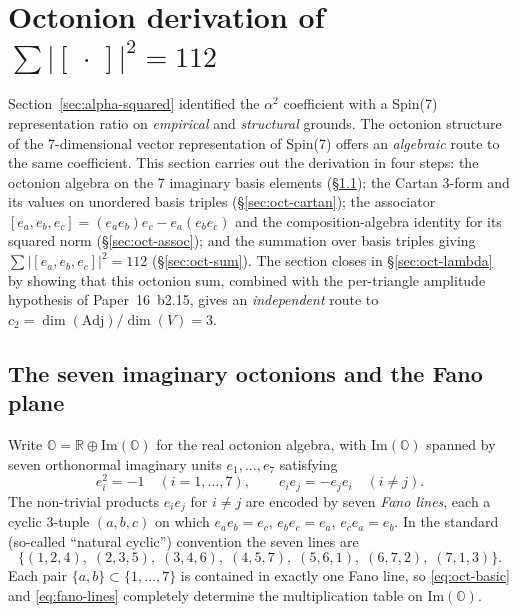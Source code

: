 \documentclass[11pt]{article}
\newcommand{\Adj}{\mathrm{Adj}}
\begin{document}
\section{Octonion derivation of $\sum|[\,\cdot\,]|^2 = 112$}
\label{sec:octonion-112}

Section~\ref{sec:alpha-squared} identified the $\alpha^2$
coefficient with a Spin(7) representation ratio on
\emph{empirical} and \emph{structural} grounds.  The octonion
structure of the 7-dimensional vector representation of Spin(7)
offers an \emph{algebraic} route to the same coefficient.  This
section carries out the derivation in four steps: the octonion
algebra on the 7 imaginary basis elements (\S\ref{sec:oct-basis});
the Cartan 3-form and its values on unordered basis triples
(\S\ref{sec:oct-cartan}); the associator
$[e_a, e_b, e_c] = (e_a e_b) e_c - e_a (e_b e_c)$ and the
composition-algebra identity for its squared norm
(\S\ref{sec:oct-assoc}); and the summation over basis triples
giving
$\sum |[e_a, e_b, e_c]|^2 = 112$ (\S\ref{sec:oct-sum}).  The
section closes in \S\ref{sec:oct-lambda} by showing that this
octonion sum, combined with the per-triangle amplitude hypothesis
of Paper~16~b2.15, gives an \emph{independent} route to
$c_2 = \dim(\Adj)/\dim(V) = 3$.

\subsection{The seven imaginary octonions and the Fano plane}
\label{sec:oct-basis}

Write $\mathbb{O} = \mathbb{R} \oplus \mathrm{Im}(\mathbb{O})$ for
the real octonion algebra, with $\mathrm{Im}(\mathbb{O})$ spanned
by seven orthonormal imaginary units $e_1, \ldots, e_7$ satisfying
\begin{equation}
  e_i^2 = -1 \quad (i = 1, \ldots, 7), \qquad
  e_i e_j = -e_j e_i \quad (i \neq j).
  \label{eq:oct-basic}
\end{equation}
The non-trivial products $e_i e_j$ for $i \neq j$ are encoded by
seven \emph{Fano lines}, each a cyclic 3-tuple $(a, b, c)$ on
which $e_a e_b = e_c$, $e_b e_c = e_a$, $e_c e_a = e_b$.  In the
standard (so-called ``natural cyclic'') convention the seven lines
are
\begin{equation}
  \{(1,2,4), \; (2,3,5), \; (3,4,6), \; (4,5,7), \;
    (5,6,1), \; (6,7,2), \; (7,1,3)\}.
  \label{eq:fano-lines}
\end{equation}
Each pair $\{a, b\} \subset \{1, \ldots, 7\}$ is contained in
exactly one Fano line, so \eqref{eq:oct-basic} and
\eqref{eq:fano-lines} completely determine the multiplication
table on $\mathrm{Im}(\mathbb{O})$.
\end{document}
